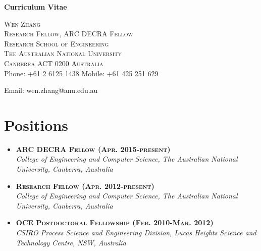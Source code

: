 \documentclass[10pt]{article}
\begin{document}
\thispagestyle{plain}
\begin{center}
\begin{huge}
\textbf{Curriculum Vitae}\\
\end{huge}
\end{center}

\begin{center}
\begin{large}
\textsc{Wen Zhang\\
Research Fellow, ARC DECRA Fellow\\
Research School of Engineering\\
The Australian National University \\
Canberra ACT 0200 Australia\\
}
Phone: +61 2 6125 1438\hspace{10pt} Mobile: +61 425 251 629

Email: wen.zhang@anu.edu.au
\end{large}
\end{center}
\hspace{0.5cm}


\section*{Positions}
\begin{itemize}
\item \textsc{\textbf{ARC DECRA Fellow (Apr. 2015-present)}}\\
\emph{College of Engineering and Computer Science, The Australian National University, Canberra, Australia}\\

\item \textsc{\textbf{Research Fellow (Apr. 2012-present)}}\\
\emph{College of Engineering and Computer Science, The Australian National University, Canberra, Australia}\\

\item \textsc{\textbf{OCE Postdoctoral Fellowship (Feb. 2010-Mar. 2012)}}\\
\emph{CSIRO Process Science and Engineering Division, Lucas Heights Science and Technology Centre, NSW, Australia}\\

\end{itemize}
\end{document}
